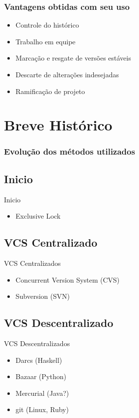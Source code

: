 \documentclass{beamer}
\begin{document}
  \begin{frame}
    \frametitle{Vantagens obtidas com seu uso}
    \begin{itemize}
      \item Controle do histórico
      \item Trabalho em equipe
      \item Marcação e resgate de versões estáveis
      \item Descarte de alterações indesejadas
      \item Ramificação de projeto
    \end{itemize}
    \vfill
  \end{frame}

  \section{Breve Histórico}
  \begin{frame}
    \frametitle{Evolução dos métodos utilizados}
    \subsection{Inicio}
    Inicio 
    \begin{itemize}
      \item Exclusive Lock
    \end{itemize}

    \subsection{VCS Centralizado}
    VCS Centralizados
    \begin{itemize}
      \item Concurrent Version System (CVS)
      \item Subversion (SVN)
    \end{itemize}
    \subsection{VCS Descentralizado}
    VCS Descentralizados
    \begin{itemize}
      \item Darcs (Haskell)
      \item Bazaar (Python)
      \item Mercurial (Java?)
      \item git (Linux, Ruby)
    \end{itemize}
    \vfill
  \end{frame}
\end{document}
